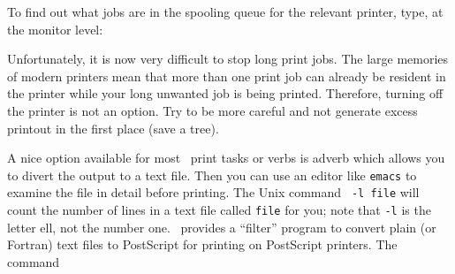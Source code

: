 
     To find out what jobs are in the spooling queue for the relevant
printer, type, at the monitor level:

     Unfortunately, it is now very difficult to stop long print jobs.
The large memories of modern printers mean that more than one print
job can already be resident in the printer while your long unwanted
job is being printed.  Therefore, turning off the printer is not an
option.  Try to be more careful and not generate excess printout in
the first place (save a tree).

     A nice option available for most \AIPS\ print tasks or verbs
is adverb {\tt {}} which allows you to divert the output
to a text file.  Then you can use an editor like {\tt emacs} to
examine the file in detail before printing.  The Unix command {\tt
{} -l {\tt file}} will count the number of lines in a text file
called {\tt file} for you; note that {\tt -l} is the letter ell, not
the number one.  \AIPS\ provides a ``filter'' program to convert plain
(or Fortran) text files to PostScript for printing on PostScript
printers.  The command


